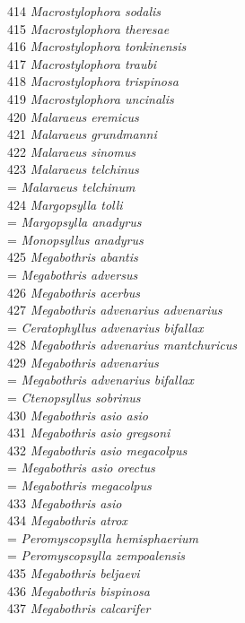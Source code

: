 \documentclass[
]{article}
\begin{document}
414 \emph{Macrostylophora sodalis}\\
415 \emph{Macrostylophora theresae}\\
416 \emph{Macrostylophora tonkinensis}\\
417 \emph{Macrostylophora traubi}\\
418 \emph{Macrostylophora trispinosa}\\
419 \emph{Macrostylophora uncinalis}\\
420 \emph{Malaraeus eremicus}\\
421 \emph{Malaraeus grundmanni}\\
422 \emph{Malaraeus sinomus}\\
423 \emph{Malaraeus telchinus}\\
= \emph{Malaraeus telchinum}\\
424 \emph{Margopsylla tolli}\\
= \emph{Margopsylla anadyrus}\\
= \emph{Monopsyllus anadyrus}\\
425 \emph{Megabothris abantis}\\
= \emph{Megabothris adversus}\\
426 \emph{Megabothris acerbus}\\
427 \emph{Megabothris advenarius advenarius}\\
= \emph{Ceratophyllus advenarius bifallax}\\
428 \emph{Megabothris advenarius mantchuricus}\\
429 \emph{Megabothris advenarius}\\
= \emph{Megabothris advenarius bifallax}\\
= \emph{Ctenopsyllus sobrinus}\\
430 \emph{Megabothris asio asio}\\
431 \emph{Megabothris asio gregsoni}\\
432 \emph{Megabothris asio megacolpus}\\
= \emph{Megabothris asio orectus}\\
= \emph{Megabothris megacolpus}\\
433 \emph{Megabothris asio}\\
434 \emph{Megabothris atrox}\\
= \emph{Peromyscopsylla hemisphaerium}\\
= \emph{Peromyscopsylla zempoalensis}\\
435 \emph{Megabothris beljaevi}\\
436 \emph{Megabothris bispinosa}\\
437 \emph{Megabothris calcarifer}\\
\end{document}
